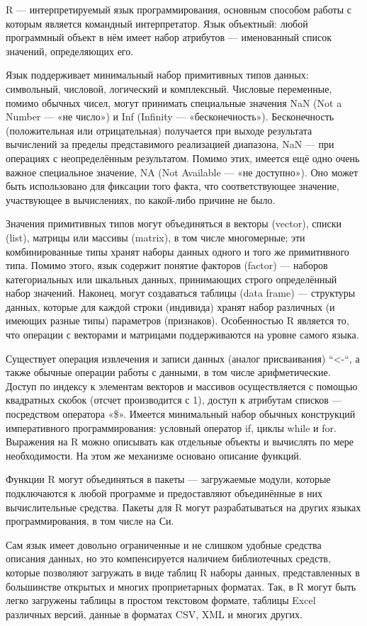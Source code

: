 \documentclass[a4paper,14pt]{extarticle}
\begin{document}
R — интерпретируемый язык программирования, основным способом работы с
которым является командный интерпретатор. Язык объектный: любой программный
объект в нём имеет набор атрибутов — именованный список значений,
определяющих его.

Язык поддерживает минимальный набор примитивных типов данных: символьный,
числовой, логический и комплексный. Числовые переменные, помимо обычных
чисел, могут принимать специальные значения NaN (Not a Number — «не число»)
и Inf (Infinity — «бесконечность»). Бесконечность (положительная или
отрицательная) получается при выходе результата вычислений за пределы
представимого реализацией диапазона, NaN — при операциях с неопределённым
результатом. Помимо этих, имеется ещё одно очень важное специальное
значение, NA (Not Available — «не доступно»). Оно может быть использовано
для фиксации того факта, что соответствующее значение, участвующее в
вычислениях, по какой-либо причине не было.

Значения примитивных типов могут объединяться в векторы (vector), списки
(list), матрицы или массивы (matrix), в том числе многомерные; эти
комбинированные типы хранят наборы данных одного и того же примитивного
типа. Помимо этого, язык содержит понятие факторов (factor) — наборов
категориальных или шкальных данных, принимающих строго определённый набор
значений. Наконец, могут создаваться таблицы (data frame) — структуры
данных, которые для каждой строки (индивида) хранят набор различных (и
имеющих разные типы) параметров (признаков). Особенностью R является то, что
операции с векторами и матрицами поддерживаются на уровне самого языка.

Существует операция извлечения и записи данных (аналог присваивания) “<-“, а
также обычные операции работы с данными, в том числе арифметические. Доступ
по индексу к элементам векторов и массивов осуществляется с помощью
квадратных скобок (отсчет производится с 1), доступ к атрибутам списков —
посредством оператора «\$». Имеется минимальный набор обычных конструкций
императивного программирования: условный оператор if, циклы while и for.
Выражения на R можно описывать как отдельные объекты и вычислять по мере
необходимости. На этом же механизме основано описание функций.

Функции R могут объединяться в пакеты — загружаемые модули, которые
подключаются к любой программе и предоставляют объединённые в них
вычислительные средства. Пакеты для R могут разрабатываться на других языках
программирования, в том числе на Си.

Сам язык имеет довольно ограниченные и не слишком удобные средства описания
данных, но это компенсируется наличием библиотечных средств, которые
позволяют загружать в виде таблиц R наборы данных, представленных в
большинстве открытых и многих проприетарных форматах. Так, в R могут быть
легко загружены таблицы в простом текстовом формате, таблицы Excel различных
версий, данные в форматах CSV, XML и многих других.
\end{document}
